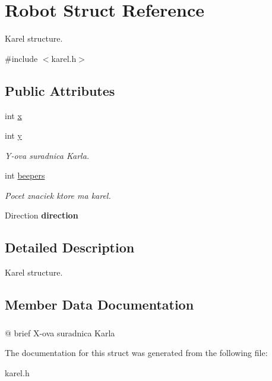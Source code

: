 \hypertarget{structRobot}{
\section{Robot Struct Reference}
\label{structRobot}
}


Karel structure.  




{\ttfamily \#include $<$karel.h$>$}

\subsection*{Public Attributes}
\begin{DoxyCompactItemize}
\item 
int \hyperlink{structRobot_ad1b063cbd8643fab96cf5d6f45bb7913}{x}
\item 
\hypertarget{structRobot_a7c74bd79cd4d3d685bf15c0e0ca159cc}{
int \hyperlink{structRobot_a7c74bd79cd4d3d685bf15c0e0ca159cc}{y}}
\label{structRobot_a7c74bd79cd4d3d685bf15c0e0ca159cc}

\begin{DoxyCompactList}\small\item\em Y-\/ova suradnica Karla. \item\end{DoxyCompactList}\item 
\hypertarget{structRobot_acf36705cf957b8aa11f37b8f8e6b8315}{
int \hyperlink{structRobot_acf36705cf957b8aa11f37b8f8e6b8315}{beepers}}
\label{structRobot_acf36705cf957b8aa11f37b8f8e6b8315}

\begin{DoxyCompactList}\small\item\em Pocet znaciek ktore ma karel. \item\end{DoxyCompactList}\item 
\hypertarget{structRobot_a63366c3a7d44a8a61f67b20aa7e098d1}{
Direction {\bfseries direction}}
\label{structRobot_a63366c3a7d44a8a61f67b20aa7e098d1}

\end{DoxyCompactItemize}


\subsection{Detailed Description}
Karel structure. 

\subsection{Member Data Documentation}
\hypertarget{structRobot_ad1b063cbd8643fab96cf5d6f45bb7913}{
\subsubsection[{x}]{}}
\label{structRobot_ad1b063cbd8643fab96cf5d6f45bb7913}
@ brief X-\/ova suradnica Karla 

The documentation for this struct was generated from the following file:\begin{DoxyCompactItemize}
\item 
karel.h\end{DoxyCompactItemize}
